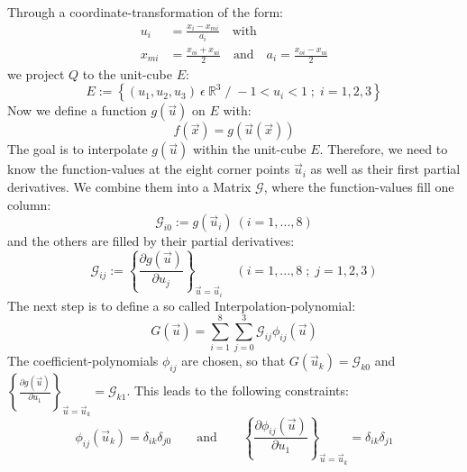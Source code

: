     Through a coordinate-transformation of the form:
    \begin{equation}
	    \begin{aligned}
		    u_{i} &= \frac{x_{i}-x_{mi}}{a_{i}} \quad  \text{with} \\
		    x_{mi} &= \frac{x_{oi}+x_{ui}}{2} \quad  \text{and} \quad  a_{i} = \frac{x_{oi}-x_{ui}}{2}
	    \end{aligned}
    \end{equation}
    we project $Q$ to the unit-cube $E$:
    \begin{equation}
	    E := \left\lbrace \left( u_{1},u_{2},u_{3} \right) ~ \epsilon ~  \mathbb{R}^{3} \;  / \;  -1 < u_{i} < 1 \;  ; \;  i=1,2,3  \right\rbrace
    \end{equation}
    Now we define a function $g(\vec{u})$ on $E$ with:
    \begin{equation}
	    f(\vec{x}) = g(\vec{u}(\vec{x}))
    \end{equation}
    The goal is to interpolate $g(\vec{u})$ within the unit-cube $E$. Therefore, we need to know the function-values at the eight corner points $\vec{u}_{i}$ as well as their first partial derivatives. We combine them into a Matrix $\mathcal{G}$, where the function-values fill one column:
    \begin{equation}
	    \mathcal{G}_{i0} := g(\vec{u}_{i}) ~ (i=1,...,8)
    \end{equation}
    and the others are filled by their partial derivatives:
    \begin{equation}
	    \mathcal{G}_{ij} := \left\lbrace \frac{\partial g(\vec{u})}{\partial u_{j}} \right\rbrace_{\vec{u}=\vec{u}_{i}} \quad (i=1,...,8 \; ; \; j=1,2,3)
    \end{equation}
    The next step is to define a so called Interpolation-polynomial:
    \begin{equation}
	    G(\vec{u})= \sum_{i=1}^{8} \sum_{j=0}^{3} \mathcal{G}_{ij} \phi_{ij}(\vec{u})
    \end{equation}
    The coefficient-polynomials $\phi_{ij}$ are chosen, so that $G(\vec{u}_{k})=\mathcal{G}_{k0}$ and \\$\left\lbrace \frac{\partial g(\vec{u})}{\partial u_{1}} \right\rbrace_{\vec{u}=\vec{u}_{k}} = \mathcal{G}_{k1}$. This leads to the following constraints:
    \begin{equation}
    \phi_{ij}(\vec{u}_{k})=\delta_{ik}\delta_{j0} \qquad \mbox{and} \qquad \left\lbrace \frac{\partial \phi_{ij}(\vec{u})}{\partial u_{1}} \right\rbrace_{\vec{u}=\vec{u}_{k}} =\delta_{ik}\delta_{j1}
    \end{equation}
